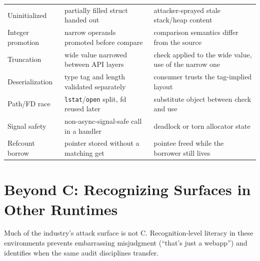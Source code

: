 \documentclass[12pt]{Training}
\begin{document}
\begin{center}
\begin{tabular}{@{}p{2.5cm}|p{5.2cm}|p{6.2cm}@{}}
Uninitialized & partially filled struct handed out & attacker-sprayed stale stack/heap content \\
Integer promotion & narrow operands promoted before compare & comparison semantics differ from the source \\
Truncation & wide value narrowed between API layers & check applied to the wide value, use of the narrow one \\
Deserialization & type tag and length validated separately & consumer trusts the tag-implied layout \\
Path/FD race & \lstinline|lstat|/\lstinline|open| split, fd reused later & substitute object between check and use \\
Signal safety & non-async-signal-safe call in a handler & deadlock or torn allocator state \\
Refcount borrow & pointer stored without a matching get & pointee freed while the borrower still lives \\
\bottomrule
\end{tabular}
\end{center}


\section*{Beyond C: Recognizing Surfaces in Other Runtimes}
Much of the industry's attack surface is not C. Recognition-level literacy in these environments prevents embarrassing misjudgment (``that's just a webapp'') and identifies when the same audit disciplines transfer.
\end{document}
